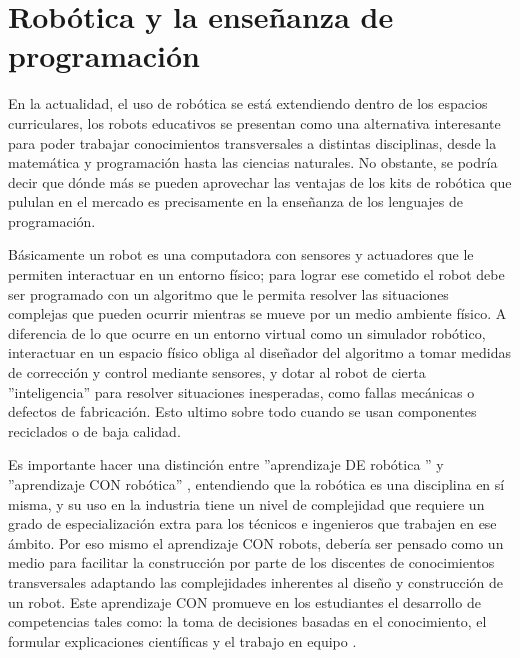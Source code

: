 \section{Robótica y la enseñanza de programación}

En la actualidad, el uso de robótica se está extendiendo dentro de los espacios curriculares, los robots educativos se presentan como una alternativa interesante para poder trabajar conocimientos transversales a distintas disciplinas, desde la matemática y programación hasta las ciencias naturales. No obstante, se podría decir que dónde más se pueden aprovechar las ventajas de los kits de robótica que pululan en el mercado es precisamente en la enseñanza de los lenguajes de programación.

Básicamente un robot es una computadora con sensores y actuadores que le permiten interactuar en un entorno físico; para lograr ese cometido el robot debe ser programado con un algoritmo que le permita resolver las situaciones complejas que pueden ocurrir mientras se mueve por un medio ambiente físico. A diferencia de lo que ocurre en un entorno virtual como un simulador robótico, interactuar en un espacio físico obliga al diseñador del algoritmo a tomar medidas de corrección y control mediante sensores, y dotar al robot de cierta ''inteligencia'' para resolver situaciones inesperadas, como fallas mecánicas o defectos de fabricación. Esto ultimo sobre todo cuando se usan componentes reciclados o de baja calidad.

Es importante hacer una distinción entre ''aprendizaje DE robótica '' y ''aprendizaje CON robótica'' \citep{malec2001some}, entendiendo que la robótica es una disciplina en sí misma, y su uso en la industria tiene un nivel de complejidad que requiere un grado de especialización extra para los técnicos e ingenieros que trabajen en ese ámbito. Por eso mismo el aprendizaje CON robots, debería ser pensado como un medio para facilitar la construcción por parte de los discentes de conocimientos transversales adaptando las complejidades inherentes al diseño y construcción de un robot. Este aprendizaje CON  promueve en los estudiantes el desarrollo de competencias tales como: la toma de decisiones basadas en
el conocimiento, el formular explicaciones científicas y el trabajo en equipo \citep{lopez2013aprendizaje}.
